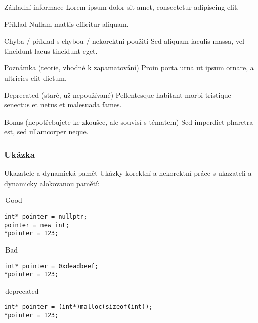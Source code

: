 

\begin{frame}[fragile]
\begin{block}{Základní informace} 
Lorem ipsum dolor sit amet, consectetur adipiscing elit.
\end{block}

\begin{exampleblock}{Příklad}
Nullam mattis efficitur aliquam.
\end{exampleblock}

\begin{alertblock}{Chyba / příklad s chybou / nekorektní použití} 
Sed aliquam iaculis massa, vel tincidunt lacus tincidunt eget.
\end{alertblock}

\begin{noteblock}{Poznámka (teorie, vhodné k zapamatování)}
Proin porta urna ut ipsum ornare, a ultricies elit dictum.
\end{noteblock}

\begin{deprecatedblock}{Deprecated (staré, už nepoužívané)} 
Pellentesque habitant morbi tristique senectus et netus et malesuada fames. 
\end{deprecatedblock}

\begin{bonusblock}{Bonus (nepotřebujete ke zkoušce, ale souvisí s tématem)}
Sed imperdiet pharetra est, sed ullamcorper neque. 
\end{bonusblock}
\end{frame}


\begin{frame}[fragile]
\frametitle{Ukázka}
\begin{block}{Ukazatele a dynamická paměť}
Ukázky korektní a nekorektní práce s ukazateli a dynamicky alokovanou pamětí:
\end{block}

\begin{twocols}

\begin{exampleblock}{\YES\,Good}
\begin{lstlisting}
int* pointer = nullptr;
pointer = new int;
*pointer = 123;
\end{lstlisting}
\end{exampleblock}
\twocolssep
\begin{alertblock}{\NO\,Bad}
\begin{lstlisting}
int* pointer = 0xdeadbeef;
*pointer = 123;
\end{lstlisting}
\end{alertblock}

\end{twocols}


\begin{deprecatedblock}{\WARNING\,deprecated}
\begin{lstlisting}
int* pointer = (int*)malloc(sizeof(int));
*pointer = 123;
\end{lstlisting}
\end{deprecatedblock}

\end{frame}



